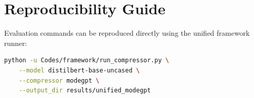 \section{Reproducibility Guide}
Evaluation commands can be reproduced directly using the unified framework runner:
\begin{lstlisting}[language=bash]
python -u Codes/framework/run_compressor.py \
    --model distilbert-base-uncased \
    --compressor modegpt \
    --output_dir results/unified_modegpt
\end{lstlisting}
